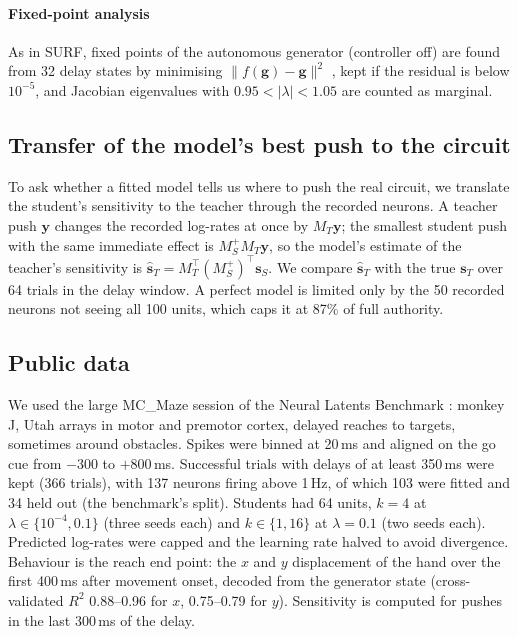 \documentclass[11pt,a4paper]{article}
\newcommand{\vect}[1]{\bm{#1}}
\begin{document}
\paragraph{Fixed-point analysis} As in SURF, fixed points of the autonomous generator (controller off) are found from 32 delay states by minimising $\lVert f(\vect g)-\vect g\rVert^2$ \citep{sussillo2013}, kept if the residual is below $10^{-5}$, and Jacobian eigenvalues with $0.95<|\lambda|<1.05$ are counted as marginal.

\subsection{Transfer of the model's best push to the circuit}\label{sec:transfer}

To ask whether a fitted model tells us where to push the real circuit, we translate the student's sensitivity to the teacher through the recorded neurons. A teacher push $\vect y$ changes the recorded log-rates at once by $M_T \vect y$; the smallest student push with the same immediate effect is $M_S^{+} M_T \vect y$, so the model's estimate of the teacher's sensitivity is $\hat{\vect s}_T = M_T^\top (M_S^{+})^\top \vect s_S$. We compare $\hat{\vect s}_T$ with the true $\vect s_T$ over 64 trials in the delay window. A perfect model is limited only by the 50 recorded neurons not seeing all 100 units, which caps it at 87\% of full authority.

\subsection{Public data}\label{sec:mcmaze}

We used the large MC\_Maze session of the Neural Latents Benchmark \citep{pei2021}: monkey J, Utah arrays in motor and premotor cortex, delayed reaches to targets, sometimes around obstacles. Spikes were binned at 20\,ms and aligned on the go cue from $-300$ to $+800$\,ms. Successful trials with delays of at least 350\,ms were kept (366 trials), with 137 neurons firing above 1\,Hz, of which 103 were fitted and 34 held out (the benchmark's split). Students had 64 units, $k=4$ at $\lambda \in \{10^{-4},0.1\}$ (three seeds each) and $k\in\{1,16\}$ at $\lambda=0.1$ (two seeds each). Predicted log-rates were capped and the learning rate halved to avoid divergence. Behaviour is the reach end point: the $x$ and $y$ displacement of the hand over the first 400\,ms after movement onset, decoded from the generator state (cross-validated $R^2$ 0.88--0.96 for $x$, 0.75--0.79 for $y$). Sensitivity is computed for pushes in the last 300\,ms of the delay.
\end{document}
